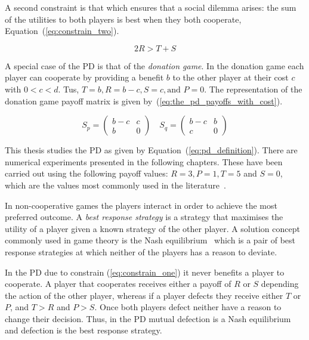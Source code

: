 A second constraint is that which ensures that a social dilemma arises: the sum
of the utilities to both players is best when they both cooperate,
Equation~(\ref{eq:constrain_two}).

\begin{equation}\label{eq:constrain_two}
    2R > T + S
\end{equation}

A special case of the PD is that of the \textit{donation game}.
In the donation game each player can cooperate by providing a benefit \(b\) to
the other player at their cost \(c\) with \(0 < c < d\). Tus, \(T=b, R=b-c,S=c,
\text{and } P=0\). The representation of the donation game payoff matrix is
given by~(\ref{eq:the_pd_payoffs_with_cost}).

\begin{equation}\label{eq:the_pd_payoffs_with_cost}
    S_p =
    \begin{pmatrix}
        b - c & c\\
        b & 0
    \end{pmatrix}
    \quad
    S_q =
    \begin{pmatrix}
        b - c & b  \\
        c & 0
    \end{pmatrix}
\end{equation}

This thesis studies the PD as given by Equation~(\ref{eq:pd_definition}). There
are numerical experiments presented in the following chapters. These have been
carried out using the following payoff values: \(R = 3, P = 1, T = 5\) and \(S =
0\), which are the values most commonly used in the
literature~\cite{Axelrod1984, Knight2017}.

In non-cooperative games the players interact in order to achieve the most
preferred outcome. A \textit{best response strategy} is a strategy
that maximises the utility of a player given a known strategy of the other
player. A solution concept commonly used in game theory is the Nash equilibrium~\cite{Nash1951}
which is a pair of best response strategies at which neither of the players has
a reason to deviate.

In the PD due to constrain (\ref{eq:constrain_one}) it never benefits a player
to cooperate. A player that cooperates receives either a payoff of \(R\) or \(S\)
depending the action of the other player, whereas if a player defects they
receive either \(T\) or \(P\), and \(T > R\) and \(P > S\). Once both
players defect neither have a reason to change their decision. Thus, in the
PD mutual defection is a Nash equilibrium and defection is the
best response strategy.

